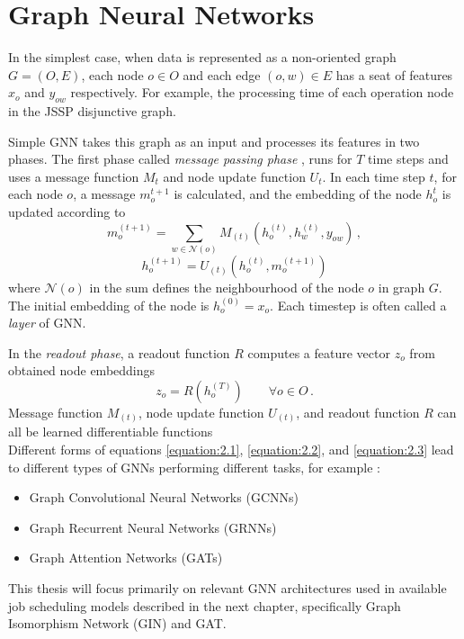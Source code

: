\section{Graph Neural Networks}

In the simplest case, when data is represented as a non-oriented graph $G = (O, E)$, each node $o \in O$ and each edge $(o, w) \in E$ has a seat of features $x_o$ and $y_{ow}$ respectively. For example, the processing time of each operation node in the JSSP disjunctive graph. 
\par
Simple GNN takes this graph as an input and processes its features in two phases. The first phase called \textit{message passing phase} \cite{pmlr-v70-gilmer17a}, runs for $T$ time steps and uses a message function $M_t$ and node update function $U_t$. In each time step $t$, for each node $o$, a message $m_o^{t + 1}$ is calculated, and the embedding of the node $h_o^{t}$ is updated according to \cite{pmlr-v70-gilmer17a}
\begin{equation}\label{equation:2.1}
	m_o^{(t + 1)} = \sum_{w \in \mathcal{N}(o)} M_{(t)} (h_o^{(t)}, h_w^{(t)}, y_{ow}) \, ,
\end{equation}
\begin{equation}\label{equation:2.2}
	h_o^{(t+1)} = U_{(t)} (h_o^{(t)}, m_o^{(t+1)})
\end{equation}
where $\mathcal{N}(o)$ in the sum defines the neighbourhood of the node $o$ in graph $G$. The initial embedding of the node is $h_o^{(0)} = x_o$. Each timestep is often called a \textit{layer} of GNN.
\par
In the \textit{readout phase}, a readout function $R$ computes a feature vector $z_o$ from obtained node embeddings \cite{pmlr-v70-gilmer17a}
\begin{equation}\label{equation:2.3}
	z_o = R(h_o^{(T)}) \hspace{2em} \forall o \in O \, .
\end{equation}
Message function $M_{(t)}$, node update function $U_{(t)}$, and readout function $R$ can all be learned differentiable functions\\
Different forms of equations \ref{equation:2.1}, \ref{equation:2.2}, and \ref{equation:2.3} lead to different types of GNNs performing different tasks, for example \cite{10.1145/3495161, sanchez-lengeling2021a}:
\begin{itemize}
	\item Graph Convolutional Neural Networks (GCNNs)
	\item Graph Recurrent Neural Networks (GRNNs)
	\item Graph Attention Networks (GATs)
\end{itemize} 
This thesis will focus primarily on relevant GNN architectures used in available job scheduling models described in the next chapter, specifically Graph Isomorphism Network (GIN) and GAT.

